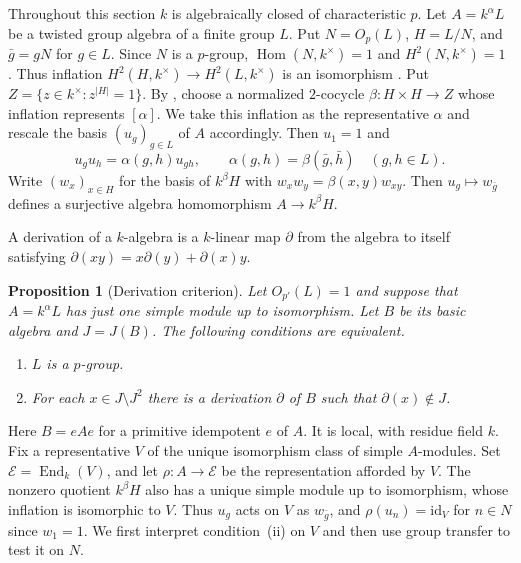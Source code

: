 \documentclass[11pt,a4paper]{article}
\newtheorem{proposition}[theorem]{Proposition}
\theoremstyle{definition}
\theoremstyle{remark}
\numberwithin{equation}{section}
\DeclareMathOperator{\End}{End}
\begin{document}
	Throughout this section $k$ is algebraically closed of characteristic $p$.
	Let $A=k^\alpha L$ be a twisted group algebra of a finite group $L$.
	Put $N=O_p(L)$, $H=L/N$, and $\bar g=gN$ for $g\in L$.
	Since $N$ is a $p$-group, $\operatorname{Hom}(N,k^\times)=1$ and
	$H^2(N,k^\times)=1$ \cite[Proposition~1.2.9(iii)]{Linckelmann2018a}. Thus inflation
	$H^2(H,k^\times)\to H^2(L,k^\times)$ is an isomorphism
	\cite[Chapter~VII, \S6, Proposition~5]{Serre1979}.
	Put $Z=\{z\in k^\times:z^{|H|}=1\}$. By
	\cite[Proposition~1.2.9(ii)]{Linckelmann2018a}, choose a normalized $2$-cocycle
	$\beta:H\times H\to Z$ whose inflation represents $[\alpha]$.
	We take this inflation as the representative $\alpha$ and rescale the
	basis $(u_g)_{g\in L}$ of $A$ accordingly. Then $u_1=1$ and
	\[
	u_gu_h=\alpha(g,h)u_{gh},\qquad
	\alpha(g,h)=\beta(\bar g,\bar h)\quad(g,h\in L).
	\]
	Write $(w_x)_{x\in H}$ for the basis of $k^\beta H$ with
	$w_xw_y=\beta(x,y)w_{xy}$. Then $u_g\mapsto w_{\bar g}$ defines a
	surjective algebra homomorphism $A\to k^\beta H$.
	
	A derivation of a $k$-algebra is a $k$-linear map $\partial$ from the
	algebra to itself satisfying $\partial(xy)=x\partial(y)+\partial(x)y$.
	
	\begin{proposition}[Derivation criterion]\label{prop:derivation}
		Let $O_{p'}(L)=1$ and suppose that $A=k^\alpha L$ has just one simple
		module up to isomorphism. Let $B$ be its basic algebra and $J=J(B)$.
		The following conditions are equivalent.
		\begin{enumerate}
			\item $L$ is a $p$-group.
			\item For each $x\in J\setminus J^2$ there is a derivation $\partial$ of $B$
			such that $\partial(x)\notin J$.
		\end{enumerate}
	\end{proposition}
	
	Here $B=eAe$ for a primitive idempotent $e$ of $A$. It is local,
	with residue field $k$. Fix a representative $V$ of the unique isomorphism
	class of simple $A$-modules. Set $\mathcal{E}=\End_k(V)$, and let $\rho:A\to \mathcal{E}$
	be the representation afforded by $V$. The nonzero quotient $k^\beta H$
	also has a unique simple module up to isomorphism, whose inflation is
	isomorphic to $V$. Thus $u_g$ acts on $V$ as $w_{\bar g}$, and
	$\rho(u_n)=\mathrm{id}_V$ for $n\in N$ since $w_1=1$.
	We first interpret condition~(ii)
	on $V$ and then use group transfer to test it on $N$.
	
\end{document}
